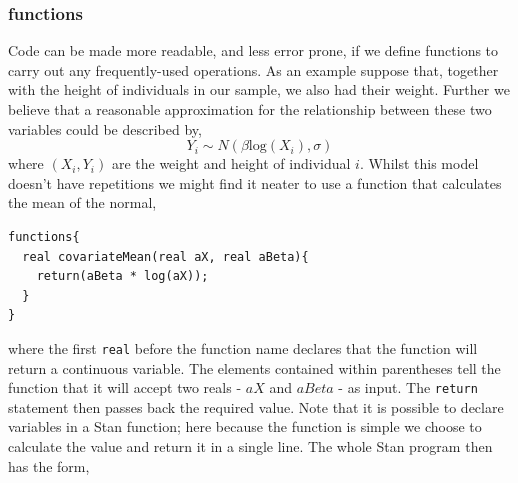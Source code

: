 \documentclass[11pt,fullpage]{book}
\begin{document}
\subsubsection{functions}
Code can be made more readable, and less error prone, if we define functions to carry out any frequently-used operations. As an example suppose that, together with the height of individuals in our sample, we also had their weight. Further we believe that a reasonable approximation for the relationship between these two variables could be described by,
%
\begin{equation}
Y_i \sim N(\beta \text{log}(X_i),\sigma)
\end{equation}
%
where $(X_i,Y_i)$ are the weight and height of individual $i$. Whilst this model doesn't have repetitions we might find it neater to use a function that calculates the mean of the normal,

\begin{verbatim}
functions{
  real covariateMean(real aX, real aBeta){
    return(aBeta * log(aX));
  }
}
\end{verbatim}

where the first \texttt{real} before the function name declares that the function will return a continuous variable. The elements contained within parentheses tell the function that it will accept two reals - $aX$ and $aBeta$ - as input. The \texttt{return} statement then passes back the required value. Note that it is possible to declare variables in a Stan function; here because the function is simple we choose to calculate the value and return it in a single line. The whole Stan program then has the form,
\end{document}
